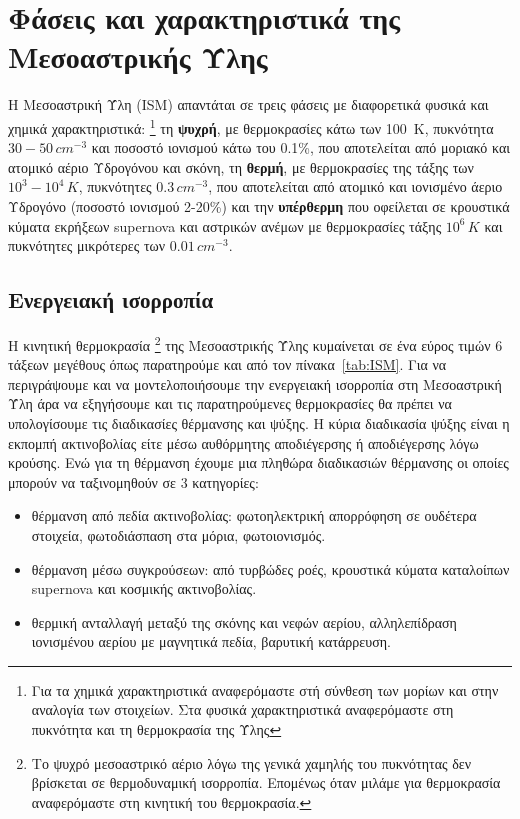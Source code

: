 \documentclass[a4paper,12pt]{memoir}
\begin{document}
\section{Φάσεις και χαρακτηριστικά της Μεσοαστρικής Ύλης}
Η Μεσοαστρική Ύλη (ISM) απαντάται σε τρεις φάσεις με διαφορετικά φυσικά και χημικά χαρακτηριστικά: 
\footnote{Για τα χημικά χαρακτηριστικά αναφερόμαστε στή σύνθεση των μορίων και στην αναλογία των στοιχείων. Στα φυσικά χαρακτηριστικά αναφερόμαστε στη πυκνότητα και τη θερμοκρασία της Ύλης} 
τη \textbf{ψυχρή}, με θερμοκρασίες κάτω των \SI{100}{\kelvin}, πυκνότητα $30-50\, cm^{-3}$ και ποσοστό ιονισμού κάτω του 0.1\%, που αποτελείται από μοριακό και ατομικό αέριο Υδρογόνου και σκόνη, τη \textbf{θερμή}, με θερμοκρασίες της τάξης των $10^3-10^4\,K$, πυκνότητες $0.3\, cm^{-3}$, που αποτελείται από ατομικό και ιονισμένο άεριο Υδρογόνο (ποσοστό ιονισμού 2-20\%) και την \textbf{υπέρθερμη} που οφείλεται σε κρουστικά κύματα εκρήξεων supernova και αστρικών ανέμων με θερμοκρασίες τάξης $10^6 \,K$ και πυκνότητες μικρότερες των $0.01\, cm^{-3}$.


\subsection{Ενεργειακή ισορροπία}
\label{par:EnergyBalance}
Η κινητική θερμοκρασία \footnote{Το ψυχρό μεσοαστρικό αέριο λόγω της γενικά χαμηλής του πυκνότητας δεν βρίσκεται σε θερμοδυναμική ισορροπία. Επομένως όταν μιλάμε για θερμοκρασία αναφερόμαστε στη κινητική του θερμοκρασία.\cite[p. 28]{spitzer_1998}} της Μεσοαστρικής Ύλης κυμαίνεται σε ένα εύρος τιμών 6 τάξεων μεγέθους όπως παρατηρούμε και από τον πίνακα~\ref{tab:ISM}. Για να περιγράψουμε και να μοντελοποιήσουμε την ενεργειακή ισορροπία στη Μεσοαστρική Ύλη άρα να εξηγήσουμε και τις παρατηρούμενες θερμοκρασίες θα πρέπει να υπολογίσουμε τις διαδικασίες θέρμανσης και ψύξης. 
Η κύρια διαδικασία ψύξης είναι η εκπομπή ακτινοβολίας είτε μέσω αυθόρμητης αποδιέγερσης ή αποδιέγερσης λόγω κρούσης. Ενώ για τη θέρμανση έχουμε μια πληθώρα διαδικασιών θέρμανσης οι οποίες μπορούν να ταξινομηθούν σε 3 κατηγορίες:
\begin{itemize}
	\item θέρμανση από πεδία ακτινοβολίας: φωτοηλεκτρική απορρόφηση σε ουδέτερα στοιχεία, φωτοδιάσπαση στα μόρια, φωτοιονισμός.
	\item θέρμανση μέσω συγκρούσεων: από τυρβώδες ροές, κρουστικά κύματα καταλοίπων supernova και κοσμικής ακτινοβολίας.
	\item θερμική ανταλλαγή μεταξύ της σκόνης και νεφών αερίου, αλληλεπίδραση ιονισμένου αερίου με μαγνητικά πεδία, βαρυτική κατάρρευση. 
\end{itemize}
\end{document}
